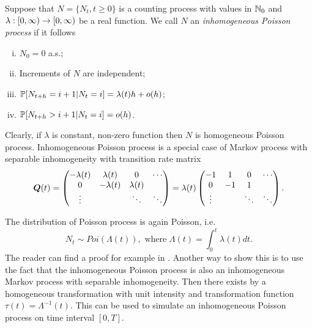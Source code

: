 {\begin{definition}
	\label{def:inhomogeneousPoisson}
	Suppose that $N = \{N_t, t \geq 0\}$ is a counting process with values in $\mathbb{N}_0$ and $\lambda : [0, \infty) \to [0, \infty)$ be a real function. We call $N$ an \emph{inhomogeneous Poisson process} if it follows
	\begin{enumerate}[i)]
		\item $N_0 = 0$ a.s.;
		\item Increments of $N$ are independent;
		\item $\operatorname{\mathbb{P}} [ N_{t+h} = i+1 \vert N_t = i ] = \lambda(t) h + o(h)$;
		\item $\operatorname{\mathbb{P}} [ N_{t+h} > i+1 \vert N_t = i ] = o(h)$.
	\end{enumerate}
\end{definition}

Clearly, if $\lambda$ is constant, non-zero function then $N$ is homogeneous Poisson process. Inhomogeneous Poisson process is a special case of Markov process with separable inhomogeneity with transition rate matrix
\[
	\bm{Q}(t) = \begin{pmatrix}
			-\lambda (t) & \lambda (t) & 0 & \cdots \\
			0 & -\lambda (t) & \lambda (t) &  \\
			\vdots & & \ddots & \ddots
\end{pmatrix} = \lambda (t) \begin{pmatrix}
			-1 & 1 & 0 & \cdots \\
			0 & -1 & 1 &  \\
			\vdots & & \ddots & \ddots
\end{pmatrix}.
\]

The distribution of Poisson process is again Poisson, i.e.
\[
	N_t \sim Poi (\Lambda(t)), \text{ where } \Lambda(t) = \int_0^t \lambda(t) dt.
\]
The reader can find a proof for example in \cite{Lewis79}. Another way to show this is to use the fact that the inhomogeneous Poisson process is also an inhomogeneous Markov process with separable inhomogeneity. Then there exists by  a homogeneous transformation with unit intensity and transformation function $\tau (t) = \Lambda^{-1} (t)$. This can be used to simulate an inhomogeneous Poisson process on time interval $[0, T]$.

}
